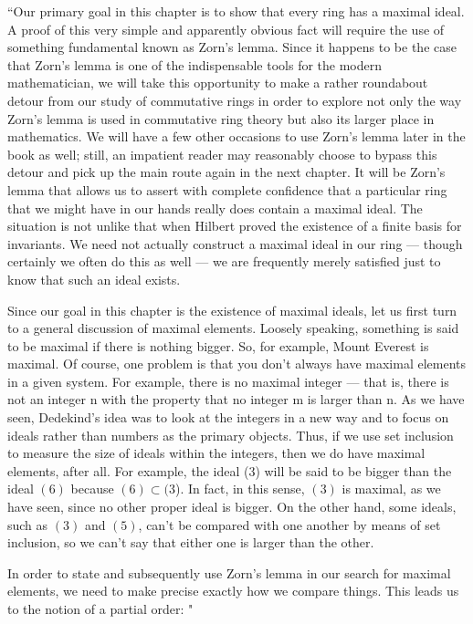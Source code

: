 \documentclass[12pt,reqno]{amsart}
\theoremstyle{plain}
\begin{document}
\begin{center}
``Our primary goal in this chapter is to show that every ring has a maximal ideal. A proof of this very simple and apparently obvious fact will require the use of something fundamental known as Zorn’s lemma. Since it happens to be the case that Zorn’s lemma is one of the indispensable tools for the modern mathematician, we will take this opportunity to make a rather roundabout detour from our study of commutative rings in order to explore not only the way Zorn’s lemma is used in commutative ring theory but also its larger place in mathematics. We will have a few other occasions to use Zorn’s lemma later in the book as well; still, an impatient reader may reasonably choose to bypass this detour and pick up the main route again in the next chapter.
It will be Zorn’s lemma that allows us to assert with complete confidence that a particular ring that we might have in our hands really does contain a maximal ideal. The situation is not unlike that when Hilbert proved the existence of a finite basis for invariants. We need not actually construct a maximal ideal in our ring — though certainly we often do this as well — we are frequently merely satisfied just to know that such an ideal exists.


Since our goal in this chapter is the existence of maximal ideals, let us first turn to a general discussion of maximal elements. Loosely speaking, something is said to be maximal if there is nothing bigger. So, for example, Mount Everest is maximal. Of course, one problem is that you don’t always have maximal elements in a given system. For example, there is no maximal integer — that is, there is not an integer n with the property that no integer m is larger than n. As we have seen, Dedekind’s idea was to look at the integers in a new way and to focus on ideals rather than numbers as the primary objects. Thus, if we use set inclusion to measure the size of ideals within the integers, then we do have maximal elements, after all. For example, the ideal (3) will be said to be bigger than the ideal $(6)$ because $(6) \subset (3$). In fact, in this sense, $(3)$ is maximal, as we have seen, since no other proper ideal is bigger. On the other hand, some ideals, such as $(3)$ and $(5)$, can’t be compared with one another by means of set inclusion, so we can’t say that either one is larger than the other.

In order to state and subsequently use Zorn’s lemma in our search for maximal elements, we need to make precise exactly how we compare things. This leads us to the notion of a partial order: "
\end{center}
\end{document}
